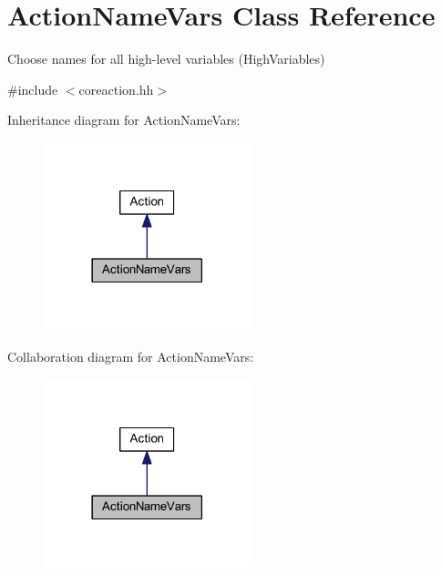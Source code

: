 \hypertarget{class_action_name_vars}{}\section{Action\+Name\+Vars Class Reference}
\label{class_action_name_vars}


Choose names for all high-\/level variables (High\+Variables)  




{\ttfamily \#include $<$coreaction.\+hh$>$}



Inheritance diagram for Action\+Name\+Vars\+:
\nopagebreak
\begin{figure}[H]
\begin{center}
\leavevmode
\includegraphics[width=170pt]{class_action_name_vars__inherit__graph}
\end{center}
\end{figure}


Collaboration diagram for Action\+Name\+Vars\+:
\nopagebreak
\begin{figure}[H]
\begin{center}
\leavevmode
\includegraphics[width=170pt]{class_action_name_vars__coll__graph}
\end{center}
\end{figure}

